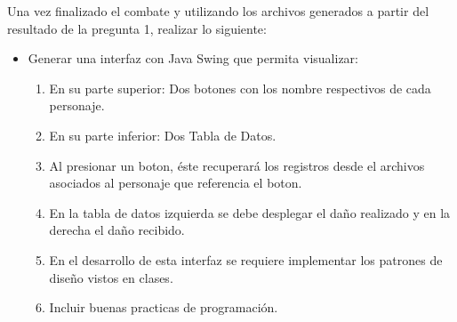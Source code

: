 \documentclass{exam}
\begin{document}
    		\item  Una vez finalizado el combate y utilizando los archivos generados a partir del resultado de la pregunta 1, realizar lo siguiente:
          \begin{itemize}
            \item Generar una interfaz con Java Swing que permita visualizar:
              \begin{enumerate}
                \item En su parte superior: Dos botones con los nombre respectivos de cada personaje.
                \item En su parte inferior: Dos Tabla de Datos.
                \item Al presionar un boton, \'este recuperar\'a los registros desde el archivos asociados al personaje que referencia el boton.
                \item En la tabla de datos izquierda se debe desplegar el daño realizado y en la derecha el daño recibido.
                \item En el desarrollo de esta interfaz se requiere implementar los patrones de diseño vistos en clases.
                \item Incluir buenas practicas de programación.
              \end{enumerate}
          \end{itemize}
\end{document}
